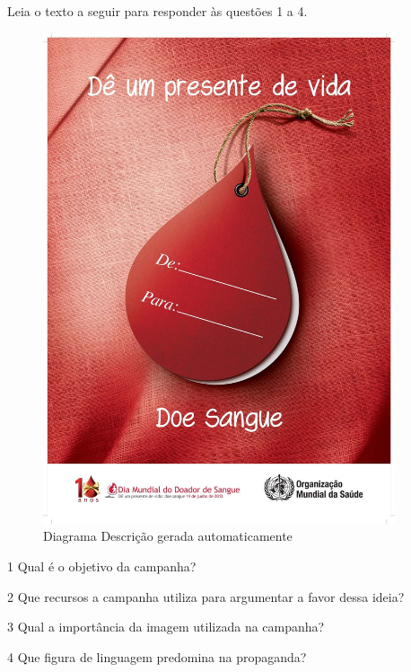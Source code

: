 {Leia o texto a seguir para responder às questões 1 a 4.

\begin{figure}
\centering
\includegraphics[width=4.07879in,height=5.68939in]{./imgSAEB_6_POR/media/image27.jpeg}
\caption{Diagrama Descrição gerada automaticamente}
\end{figure}

\num{1} Qual é o objetivo da campanha?



\num{2} Que recursos a campanha utiliza para argumentar a favor dessa
ideia?



\num{3} Qual a importância da imagem utilizada na campanha?



\num{4} Que figura de linguagem predomina na propaganda?

}
